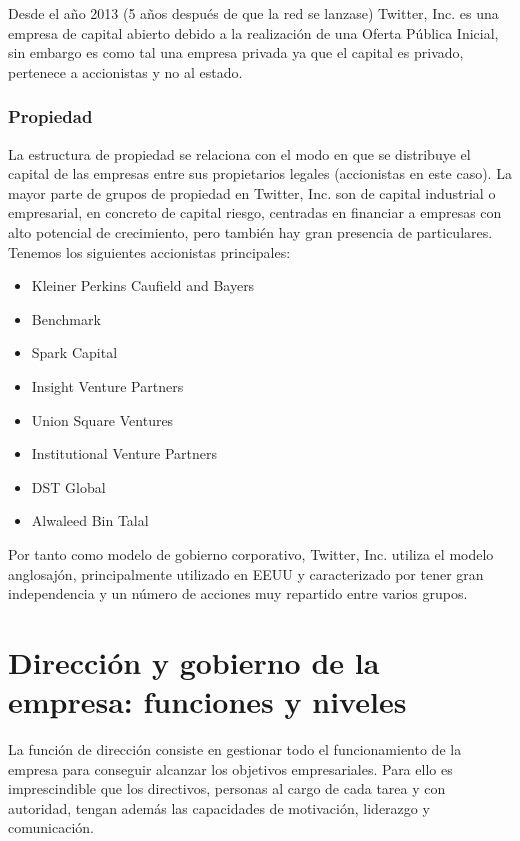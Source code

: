 Desde el año 2013 (5 años después de que la red se lanzase) Twitter, Inc. es una empresa de capital abierto debido a la realización de una Oferta Pública Inicial, sin embargo es como tal una empresa privada ya que el capital es privado, pertenece a accionistas y no al estado.

\subsubsection{Propiedad}

La estructura de propiedad se relaciona con el modo en que se distribuye el capital de las empresas entre sus propietarios legales (accionistas en este caso). La mayor parte de grupos de propiedad en Twitter, Inc. son de capital industrial o empresarial, en concreto de capital riesgo, centradas en financiar a empresas con alto potencial de crecimiento, pero también hay gran presencia de particulares. Tenemos los siguientes accionistas principales:

\begin{itemize}

\item Kleiner Perkins Caufield and Bayers
\item Benchmark
\item Spark Capital
\item Insight Venture Partners
\item Union Square Ventures
\item Institutional Venture Partners
\item DST Global
\item Alwaleed Bin Talal

\end{itemize}

Por tanto como modelo de gobierno corporativo, Twitter, Inc. utiliza el modelo anglosajón, principalmente utilizado en EEUU y caracterizado por tener gran independencia y un número de acciones muy repartido entre varios grupos.

\section{Dirección y gobierno de la empresa: funciones y niveles}

La función de dirección consiste en gestionar todo el funcionamiento de la empresa para conseguir alcanzar los objetivos empresariales. Para ello es imprescindible que los directivos, personas al cargo de cada tarea y con autoridad, tengan además las capacidades de motivación, liderazgo y comunicación.

